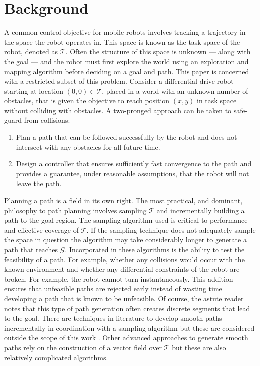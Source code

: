 \section{Background}
A common control objective for mobile robots involves tracking a trajectory in the space the robot operates in. This space is known as the task space of the robot, denoted as $\mathcal{T}$. Often the structure of this space is unknown --- along with the goal --- and the robot must first explore the world using an exploration and mapping algorithm before deciding on a goal and path.  This paper is concerned with a restricted subset of this problem. Consider a differential drive robot starting at location $(0,0)\in\mathcal{T}$, placed in a world with an unknown number of obstacles, that is given the objective to reach position $(x,y)$ in task space without colliding with obstacles. A two-pronged approach can be taken to safe-guard from collisions:
\begin{enumerate}
    \item Plan a path that can be followed successfully by the robot and does not intersect with any obstacles for all future time.
    \item Design a controller that ensures sufficiently fast convergence to the path and provides a guarantee, under reasonable assumptions, that the robot will not leave the path.
\end{enumerate}
Planning a path is a field in its own right. The most practical, and dominant, philosophy to path planning involves sampling $\mathcal{T}$ and incrementally building a path to the goal region. The sampling algorithm used is critical to performance and effective coverage of $\mathcal{T}$. If the sampling technique does not adequately sample the space in question the algorithm may take considerably longer to generate a path that reaches $\mathcal{G}$. Incorporated in these algorithms is the ability to test the feasibility of a path. For example, whether any collisions would occur with the known environment and whether any differential constraints of the robot are broken. For example, the robot cannot turn instantaneously. This addition ensures that unfeasible paths are rejected early instead of wasting time developing a path that is known to be unfeasible. Of course, the astute reader notes that this type of path generation often creates discrete segments that lead to the goal. There are techniques in literature to develop smooth paths incrementally in coordination with a sampling algorithm but these are considered outside the scope of this work \cite{Yang14}. Other advanced approaches to generate smooth paths rely on the construction of a vector field over $\mathcal{T}$ \cite{LaValle06} but these are also relatively complicated algorithms.

